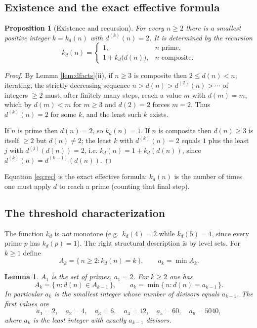 \documentclass{amsart}
\newtheorem{lemma}{Lemma}
\newtheorem{proposition}{Proposition}
\theoremstyle{definition}
\begin{document}
\subsection{Existence and the exact effective formula}

\begin{proposition}[Existence and recursion]\label{prop:akd}
For every $n\ge 2$ there is a smallest positive integer $k=k_d(n)$ with
$d^{(k)}(n)=2$. It is determined by the recursion
\begin{equation}\label{eq:rec}
k_d(n)=\begin{cases}
1, & n \text{ prime},\\[2pt]
1+k_d\bigl(d(n)\bigr), & n \text{ composite}.
\end{cases}
\end{equation}
\end{proposition}

\begin{proof}
By Lemma \ref{lem:dfacts}(ii), if $n\ge 3$ is composite then
$2\le d(n)<n$; iterating, the strictly decreasing sequence
$n>d(n)>d^{(2)}(n)>\cdots$ of integers $\ge 2$ must, after finitely many
steps, reach a value $m$ with $d(m)=m$, which by $d(m)<m$ for $m\ge3$ and
$d(2)=2$ forces $m=2$. Thus $d^{(k)}(n)=2$ for some $k$, and the least such
$k$ exists.

If $n$ is prime then $d(n)=2$, so $k_d(n)=1$. If $n$ is composite then
$d(n)\ge 3$ is itself $\ge 2$ but $d(n)\neq 2$; the least $k$ with
$d^{(k)}(n)=2$ equals $1$ plus the least $j$ with $d^{(j)}(d(n))=2$, i.e.
$k_d(n)=1+k_d(d(n))$, since $d^{(k)}(n)=d^{(k-1)}(d(n))$.
\end{proof}

Equation \eqref{eq:rec} is the exact effective formula: $k_d(n)$ is the number
of times one must apply $d$ to reach a prime (counting that final step).

\subsection{The threshold characterization}

The function $k_d$ is \emph{not} monotone (e.g.\ $k_d(4)=2$ while
$k_d(5)=1$, since every prime $p$ has $k_d(p)=1$). The right structural
description is by level sets. For $k\ge 1$ define
\[
A_k=\{\,n\ge 2: k_d(n)=k\,\},\qquad a_k=\min A_k .
\]

\begin{lemma}\label{lem:threshold}
$A_1$ is the set of primes, $a_1=2$. For $k\ge 2$ one has
\[
A_k=\{\,n: d(n)\in A_{k-1}\,\},\qquad
a_k=\min\{\,n: d(n)=a_{k-1}\,\}.
\]
In particular $a_k$ is the smallest integer whose number of divisors equals
$a_{k-1}$. The first values are
\[
a_1=2,\quad a_2=4,\quad a_3=6,\quad a_4=12,\quad a_5=60,\quad a_6=5040,
\]
where $a_{k}$ is the least integer with exactly $a_{k-1}$ divisors.
\end{lemma}
\end{document}

